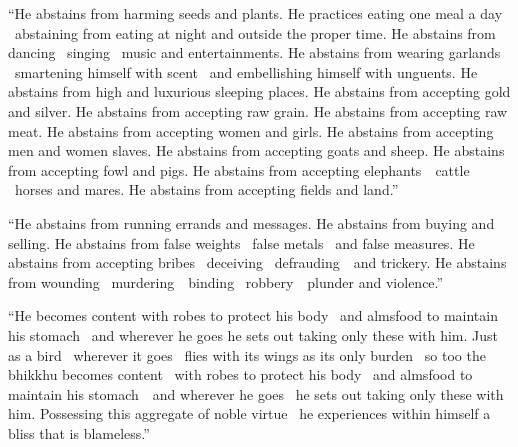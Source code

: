 \begin{english-only-justify}
  ``He abstains from harming seeds and plants. He practices eating one meal a day \breathmark\ abstaining from eating at night and outside the proper time. He abstains from dancing \breathmark\ singing \breathmark\ music and entertainments. He abstains from wearing garlands \breathmark\ smartening himself with scent \breathmark\ and embellishing himself with unguents. He abstains from high and luxurious sleeping places. He abstains from accepting gold and silver. He abstains from accepting raw grain. He abstains from accepting raw meat. He abstains from accepting women and girls. He abstains from accepting men and women slaves. He abstains from accepting goats and sheep. He abstains from accepting fowl and pigs. He abstains from accepting \mbox{elephants}~\breathmark\ cattle \breathmark\ horses and mares. He abstains from accepting fields and land.''
\end{english-only-justify}

\begin{english-only-justify}
  ``He abstains from running errands and messages. He abstains from buying and selling. He abstains from false weights \breathmark\ false metals \breathmark\ and false measures. He abstains from accepting bribes \breathmark\ deceiving \breathmark\ \mbox{defrauding}~\breathmark\ and trickery. He abstains from wounding \breathmark\ \mbox{murdering}~\breathmark\ binding \breathmark\ \mbox{robbery}~\breathmark\ plunder and violence.''
\end{english-only-justify}

\begin{english-only-justify}
  ``He becomes content with robes to protect his body \breathmark\ and almsfood to maintain his stomach \breathmark\ and wherever he goes he sets out taking only these with him. Just as a bird \breathmark\ wherever it goes \breathmark\ flies with its wings as its only burden \breathmark\ so too the bhikkhu becomes content \breathmark\ with robes to protect his body \breathmark\ and almsfood to maintain his \mbox{stomach}~\breathmark\ and wherever he goes \breathmark\ he sets out taking only these with him. Possessing this aggregate of noble virtue \breathmark\ he experiences within himself a bliss that is blameless.''
\end{english-only-justify}

\suttaRef{[MN 51]}

